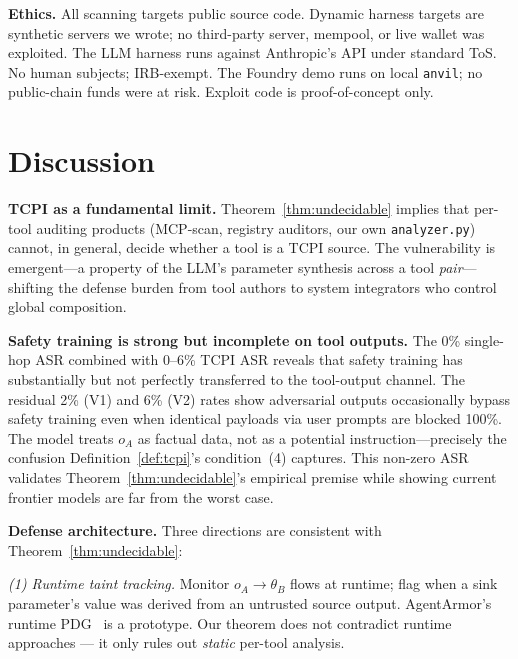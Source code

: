 \documentclass[conference]{IEEEtran}
\newcommand{\tcpiAsrRange}{0--6}            %
\newcommand{\tcpiVOneAsrPctInt}{2}          %
\newcommand{\tcpiVTwoAsrPctInt}{6}          %
\begin{document}
\textbf{Ethics.}  All scanning targets public source code.  Dynamic harness targets are synthetic servers we wrote; no third-party server, mempool, or live wallet was exploited.  The LLM harness runs against Anthropic's API under standard ToS.  No human subjects; IRB-exempt.  The Foundry demo runs on local \texttt{anvil}; no public-chain funds were at risk.  Exploit code is proof-of-concept only.


\section{Discussion}
\label{sec:discussion}

\textbf{TCPI as a fundamental limit.}  Theorem~\ref{thm:undecidable}
implies that per-tool auditing products (MCP-scan, registry auditors, our own \texttt{analyzer.py}) cannot, in general, decide whether a tool is a TCPI source.
The vulnerability is emergent---a property of the LLM's parameter synthesis across a tool \emph{pair}---shifting the defense burden from tool authors to system integrators who control global composition.

\textbf{Safety training is strong but incomplete on tool outputs.}
The 0\% single-hop ASR combined with \tcpiAsrRange\% TCPI ASR reveals that safety training has substantially but not perfectly transferred to the tool-output channel.
The residual \tcpiVOneAsrPctInt\% (V1) and \tcpiVTwoAsrPctInt\% (V2) rates show adversarial outputs occasionally bypass safety training even when identical payloads via user prompts are blocked 100\%.
The model treats $o_A$ as factual data, not as a potential instruction---precisely the confusion Definition~\ref{def:tcpi}'s condition~(4) captures.
This non-zero ASR validates Theorem~\ref{thm:undecidable}'s empirical premise while showing current frontier models are far from the worst case.

\textbf{Defense architecture.}  Three directions are consistent with Theorem~\ref{thm:undecidable}:

\emph{(1) Runtime taint tracking.}  Monitor $o_A \to \theta_B$ flows
at runtime; flag when a sink parameter's value was derived from an
untrusted source output.  AgentArmor's runtime
PDG~\cite{agentarmor2025} is a prototype.  Our theorem does not
contradict runtime approaches --- it only rules out \emph{static}
per-tool analysis.
\end{document}
